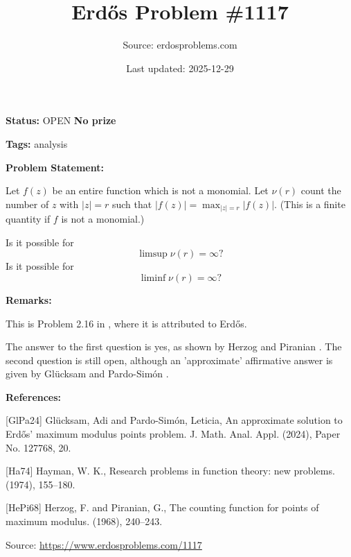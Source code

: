 \documentclass{article}
\title{Erd\H{o}s Problem \#1117}
\date{Last updated: 2025-12-29}
\author{Source: erdosproblems.com}
\begin{document}
\maketitle

\noindent\textbf{Status:} OPEN \quad \textbf{No prize}

\noindent\textbf{Tags:} analysis

\medskip
\noindent\textbf{Problem Statement:}

Let $f(z)$ be an entire function which is not a monomial. Let $\nu(r)$ count the number of $z$ with $\lvert z\rvert=r$ such that $\lvert f(z)\rvert=\max_{\lvert z\rvert=r}\lvert f(z)\rvert$. (This is a finite quantity if $f$ is not a monomial.)

Is it possible for\[\limsup \nu(r)=\infty?\]Is it possible for\[\liminf \nu(r)=\infty?\]

\bigskip
\noindent\textbf{Remarks:}

This is Problem 2.16 in \cite{Ha74}, where it is attributed to Erd\H{o}s.

The answer to the first question is yes, as shown by Herzog and Piranian \cite{HePi68}. The second question is still open, although an 'approximate' affirmative answer is given by Gl\"{u}cksam and Pardo-Sim\'{o}n \cite{GlPa24}.

\bigskip
\noindent\textbf{References:}

[GlPa24] Gl\"ucksam, Adi and Pardo-Sim\'on, Leticia, An approximate solution to {E}rd\H{o}s' maximum modulus points
problem. J. Math. Anal. Appl. (2024), Paper No. 127768, 20.
 
 [Ha74] Hayman, W. K., Research problems in function theory: new problems. (1974), 155--180.
 
 [HePi68] Herzog, F. and Piranian, G., The counting function for points of maximum modulus. (1968), 240--243.

\bigskip
\noindent\small{Source: \url{https://www.erdosproblems.com/1117}}
\end{document}
